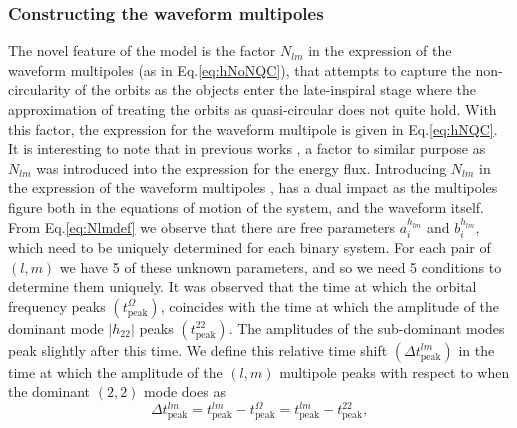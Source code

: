 \documentclass[aps,
prd,
amsmath,
amssymb,
twocolumn,
floatfix,
groupedaddress]{revtex4-1}
\newcommand{\ii}{{\rm i}}
\newcommand{\peak}{\mathrm{peak}}
\begin{document}
\subsubsection{Constructing the waveform multipoles}\label{sec:level3:hlm}
The novel feature of the model is the factor $N_{lm}$ in the expression of the waveform multipoles (as in Eq.\eqref{eq:hNoNQC}), that attempts to capture the non-circularity of the orbits as the objects enter the late-inspiral stage where the approximation of treating the orbits as quasi-circular does not quite hold. With this factor, the expression for the waveform multipole is given in Eq.\eqref{eq:hNQC}. It is interesting to note that in previous works \citep{EOBdevel02,EOBNRdevel04}, a factor to similar purpose as $N_{lm}$ was introduced into the expression for the energy flux. Introducing $N_{lm}$ in the expression of the waveform multipoles \citep{DamourNQC01,BuonannoEOBv2Main}, has a dual impact as the multipoles figure both in the equations of motion of the system, and the waveform itself.
From Eq.\eqref{eq:Nlmdef} we observe that there are free parameters $a_i^{h_{lm}}$ and $b_i^{h_{lm}}$, which need to be uniquely determined for each binary system. For each pair of $(l,m)$ we have 5 of these unknown parameters, and so we need 5 conditions to determine them uniquely. It was observed \citep{BuonannoEOBv2Main} that the time at which the orbital frequency peaks $(t^{\Omega}_{\peak})$, coincides with the time at which the amplitude of the dominant mode $|h_{22}|$ peaks $(t^{22}_{\peak})$. The amplitudes of the sub-dominant modes peak slightly after this time. We define this relative time shift $(\Delta t^{lm}_{\peak})$ in the time at which the amplitude of the $(l,m)$ multipole peaks with respect to when the dominant $(2,2)$ mode does as
\begin{equation}
\Delta t^{lm}_{\peak} = t^{lm}_{\peak} - t^{\Omega}_{\peak} = t^{lm}_{\peak} - t^{22}_{\peak},
\end{equation}
\end{document}
